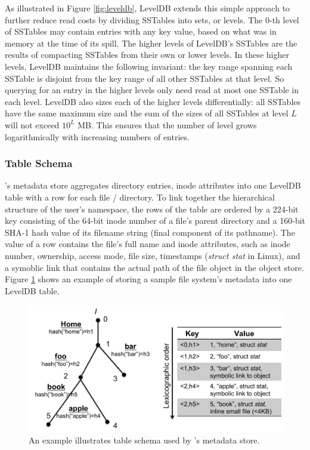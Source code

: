 As illustrated in Figure \ref{fig:leveldb}, LevelDB extends this simple approach to further reduce read costs by dividing SSTables into sets, or levels.
The 0-th level of SSTables may contain entries with any key value, based on what was in memory at the time of its spill.
The higher levels of LevelDB's SSTables are the results of compacting SSTables from their own or lower levels.
In these higher levels, LevelDB maintains the following invariant: the key range spanning each SSTable is disjoint from the key range of all other SSTables at that level.
So querying for an entry in the higher levels only need read at most one SSTable in each level.
LevelDB also sizes each of the higher levels differentially:  all SSTables have the same maximum size and the sum of the sizes of all SSTables at level $L$ will not exceed $10^L$ MB.
This ensures that the number of level grows logarithmically with increasing numbers of entries.

\subsubsection*{Table Schema} 

\tfs's metadata store aggregates directory entries, 
inode attributes into one LevelDB table with a row for each file / directory.
To link together the hierarchical structure of the user's namespace,
the rows of the table are ordered by a 224-bit key consisting of 
the 64-bit inode number of a file's parent directory 
and a 160-bit SHA-1 hash value of its filename string (final component of its pathname).
The value of a row contains the file's full name and inode attributes,
such as inode number, ownership, access mode, file size, timestamps (\textit{struct stat} in Linux),
and a symoblic link that contains the actual path of the file object in the object store.
Figure \ref{fig:schema} shows an example of storing a sample file system's metadata into one LevelDB table.

\begin{figure}[!ht]
\centering
\includegraphics[scale=0.35]{figs/schema}
\caption{An example illustrates table schema used by \tfs's metadata store.}
\label{fig:schema}
\end{figure}

